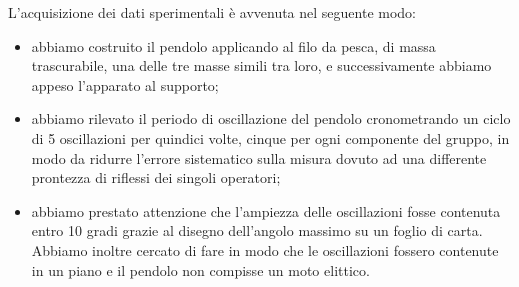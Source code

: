 L'acquisizione dei dati sperimentali è avvenuta nel seguente modo:
\begin{itemize}
	\item{abbiamo costruito il pendolo applicando al filo da pesca, di massa trascurabile, una delle tre masse simili tra loro, e successivamente abbiamo appeso l'apparato al supporto;}
	\item{abbiamo rilevato il periodo di oscillazione del pendolo cronometrando un ciclo di 5 oscillazioni per quindici volte, cinque per ogni componente del gruppo, in modo da ridurre l'errore sistematico sulla misura dovuto ad una differente prontezza di riflessi dei singoli operatori;}
	\item{abbiamo prestato attenzione che l'ampiezza delle oscillazioni fosse contenuta entro 10 gradi grazie al disegno dell'angolo massimo su un foglio di carta. Abbiamo inoltre cercato di fare in modo che le oscillazioni fossero contenute in un piano e il pendolo non compisse un moto elittico.}
\end{itemize}
